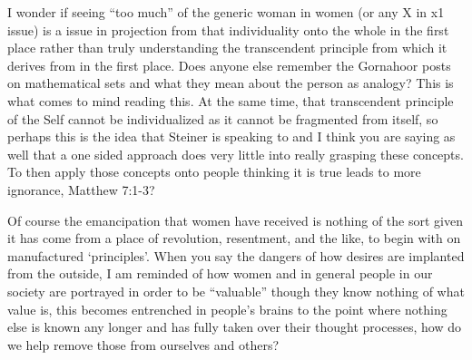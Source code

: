 \begin{footnotesize}
\begin{sffamily}
I wonder if seeing ``too much'' of the generic woman in women (or any X in x1 issue) is a issue in projection from that individuality onto the whole in the first place rather than truly understanding the transcendent principle from which it derives from in the first place. Does anyone else remember the Gornahoor posts on mathematical sets and what they mean about the person as analogy? This is what comes to mind reading this. At the same time, that transcendent principle of the Self cannot be individualized as it cannot be fragmented from itself, so perhaps this is the idea that Steiner is speaking to and I think you are saying as well that a one sided approach does very little into really grasping these concepts. To then apply those concepts onto people thinking it is true leads to more ignorance, Matthew 7:1-3?

Of course the emancipation that women have received is nothing of the sort given it has come from a place of revolution, resentment, and the like, to begin with on manufactured `principles'. When you say the dangers of how desires are implanted from the outside, I am reminded of how women and in general people in our society are portrayed in order to be ``valuable'' though they know nothing of what value is, this becomes entrenched in people's brains to the point where nothing else is known any longer and has fully taken over their thought processes, how do we help remove those from ourselves and others?

\hfill

\end{sffamily}
\end{footnotesize}

